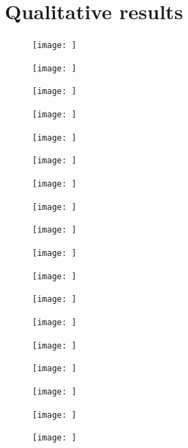 \documentclass[USenglish]{ifimaster}  %
\begin{document}
\section{Qualitative results}

\iffalse

\begin{figure}[!htb]
  \texttt{[image: ]}
  \caption{}\label{fig:}
\endminipage\hfill
{}
  \texttt{[image: ]}
  \caption{}\label{fig:}
\endminipage\hfill
{}%
  \texttt{[image: ]}
  \caption{}\label{fig:}
\endminipage
\end{figure}

\begin{figure}[!htb]
  \texttt{[image: ]}
  \caption{}\label{fig:}
\endminipage\hfill
{}
  \texttt{[image: ]}
  \caption{}\label{fig:}
\endminipage\hfill
{}%
  \texttt{[image: ]}
  \caption{}\label{fig:}
\endminipage
\end{figure}

\begin{figure}[!htb]
  \texttt{[image: ]}
  \caption{}\label{fig:}
\endminipage\hfill
{}
  \texttt{[image: ]}
  \caption{}\label{fig:}
\endminipage\hfill
{}%
  \texttt{[image: ]}
  \caption{}\label{fig:}
\endminipage
\end{figure}

\begin{figure}[!htb]
  \texttt{[image: ]}
  \caption{}\label{fig:}
\endminipage\hfill
{}
  \texttt{[image: ]}
  \caption{}\label{fig:}
\endminipage\hfill
{}%
  \texttt{[image: ]}
  \caption{}\label{fig:}
\endminipage
\end{figure}

\begin{figure}[!htb]
  \texttt{[image: ]}
  \caption{}\label{fig:}
\endminipage\hfill
{}
  \texttt{[image: ]}
  \caption{}\label{fig:}
\endminipage\hfill
{}%
  \texttt{[image: ]}
  \caption{}\label{fig:}
\endminipage
\end{figure}

\begin{figure}[!htb]
  \texttt{[image: ]}
  \caption{}\label{fig:}
\endminipage\hfill
{}
  \texttt{[image: ]}
  \caption{}\label{fig:}
\endminipage\hfill
{}%
  \texttt{[image: ]}
  \caption{}\label{fig:}
\endminipage
\end{figure}
\end{document}
